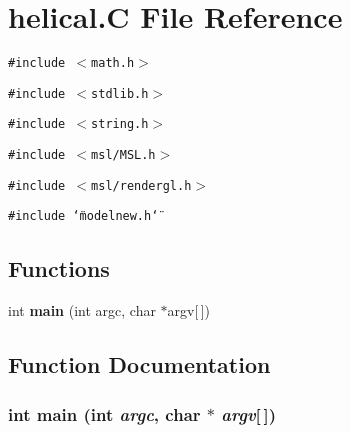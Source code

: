 \section{helical.C File Reference}
\label{helical_8C}
{\tt \#include $<$math.h$>$}\par
{\tt \#include $<$stdlib.h$>$}\par
{\tt \#include $<$string.h$>$}\par
{\tt \#include $<$msl/MSL.h$>$}\par
{\tt \#include $<$msl/rendergl.h$>$}\par
{\tt \#include \char`\"{}modelnew.h\char`\"{}}\par
\subsection*{Functions}
\begin{CompactItemize}
\item 
int {\bf main} (int argc, char $\ast$argv[$\,$])
\end{CompactItemize}


\subsection{Function Documentation}
\subsubsection{\setlength{\rightskip}{0pt plus 5cm}int main (int {\em argc}, char $\ast$ {\em argv}[$\,$])}\label{helical_8C_a0}


